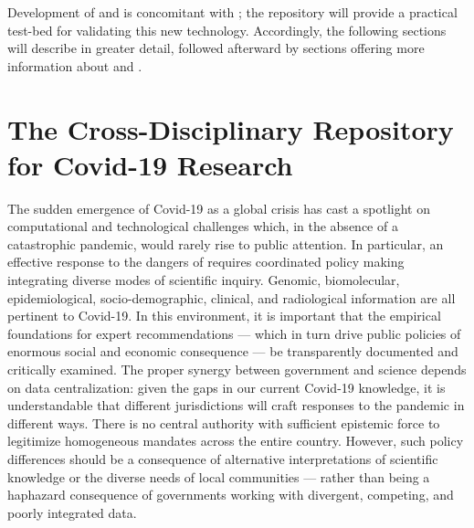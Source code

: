\documentclass[11pt,letterpaper]{article}
\newcommand{\textds}[1]{{\fontfamily{lmdh}\selectfont{%
\raisebox{-1pt}{#1}}}}
\newcommand{\dsC}{{\textds{ds}{\fontfamily{qhv}\selectfont \raisebox{-1pt}
{\color{red!15!black}{C}}}}}
\newcommand{\ATextCClr}[1]{\textcolor{atcColor}{\textbf{#1}}}
\newcommand{\CRtwo}{{\resizebox{!}{7.5pt}{\ATextCClr{CR2}}}}
\newcommand{\THQL}{\resizebox{!}{7.5pt}{\ATextCClr{THQL}}}
\newcommand{\p}[1]{

\vspace{1em}#1}
\newcommand{\textds}[1]{{\fontfamily{lmdh}\selectfont{%
\raisebox{-1pt}{#1}}}}
\newcommand{\dsC}{{\textds{ds}{\fontfamily{qhv}\selectfont \raisebox{-1pt}{C}}}}
\begin{document}
{\p{Development of \THQL{} and \dsC{} is 
concomitant with \CRtwo{}; the \CRtwo{} repository will 
provide a practical test-bed for validating 
this new technology.  Accordingly, the 
following sections will describe \CRtwo{} 
in greater detail, followed afterward by 
sections offering more information about 
\THQL{} and \dsC{}.}

\section{The Cross-Disciplinary Repository for Covid-19 Research}
\p{The sudden emergence of Covid-19 as a global crisis has 
cast a spotlight on computational and technological challenges 
which, in the absence of a catastrophic pandemic, would 
rarely rise to public attention.  In particular, an effective 
response to the dangers of \makebox{SARS-CoV-2} requires coordinated 
policy making integrating diverse modes of scientific inquiry.  
Genomic, biomolecular, epidemiological, socio-demographic, clinical, 
and radiological information are all pertinent to Covid-19.  
In this environment, it is important that the 
empirical foundations for expert recommendations --- which 
in turn drive public policies of enormous social and 
economic consequence --- be transparently documented 
and critically examined.  The proper synergy between government 
and science depends on data centralization: given 
the gaps in our current Covid-19 knowledge, it is 
understandable that different jurisdictions will craft responses to 
the pandemic in different ways.  There is no central authority 
with sufficient epistemic force to legitimize homogeneous 
mandates across the entire country.  However, such 
policy differences should be a consequence of alternative interpretations of 
scientific knowledge or the diverse needs of local communities  
--- rather than being a haphazard consequence of governments 
working with divergent, competing, and poorly integrated data.}

}
\end{document}
